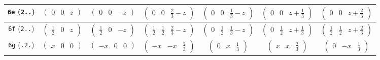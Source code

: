 \documentclass[fleqn,9pt,landscape]{jsarticle}
\begin{document}
\begin{center}
\begin{longtable}{ccccccc}
{\tt 6e} ({\tt 2..}) & $ \begin{pmatrix} 0 & 0 & z \end{pmatrix} $ & $ \begin{pmatrix} 0 & 0 & - z \end{pmatrix} $ & $ \begin{pmatrix} 0 & 0 & \frac{2}{3} - z \end{pmatrix} $ & $ \begin{pmatrix} 0 & 0 & \frac{1}{3} - z \end{pmatrix} $ & $ \begin{pmatrix} 0 & 0 & z + \frac{1}{3} \end{pmatrix} $ & $ \begin{pmatrix} 0 & 0 & z + \frac{2}{3} \end{pmatrix} $ \\ \hline
{\tt 6f} ({\tt 2..}) & $ \begin{pmatrix} \frac{1}{2} & 0 & z \end{pmatrix} $ & $ \begin{pmatrix} \frac{1}{2} & 0 & - z \end{pmatrix} $ & $ \begin{pmatrix} \frac{1}{2} & \frac{1}{2} & \frac{2}{3} - z \end{pmatrix} $ & $ \begin{pmatrix} 0 & \frac{1}{2} & \frac{1}{3} - z \end{pmatrix} $ & $ \begin{pmatrix} 0 & \frac{1}{2} & z + \frac{1}{3} \end{pmatrix} $ & $ \begin{pmatrix} \frac{1}{2} & \frac{1}{2} & z + \frac{2}{3} \end{pmatrix} $ \\ \hline
{\tt 6g} ({\tt .2.}) & $ \begin{pmatrix} x & 0 & 0 \end{pmatrix} $ & $ \begin{pmatrix} - x & 0 & 0 \end{pmatrix} $ & $ \begin{pmatrix} - x & - x & \frac{2}{3} \end{pmatrix} $ & $ \begin{pmatrix} 0 & x & \frac{1}{3} \end{pmatrix} $ & $ \begin{pmatrix} x & x & \frac{2}{3} \end{pmatrix} $ & $ \begin{pmatrix} 0 & - x & \frac{1}{3} \end{pmatrix} $ \\ \hline

\end{longtable}
\end{center}
\end{document}
